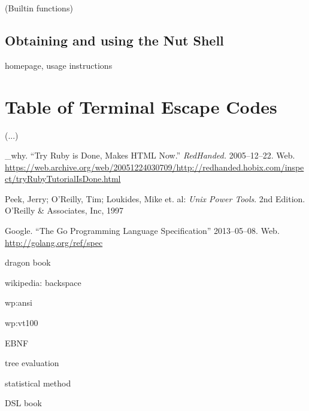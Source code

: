 \documentclass[paper=a4,twoside,abstract=on,cleardoublepage=empty,numbers=noenddot,toc=bib,12pt,appendixprefix=true]{scrreprt}
\begin{document}
(Builtin functions)

\section{Obtaining and using the Nut Shell}

homepage, usage instructions

\chapter{Table of Terminal Escape Codes}
\label{sec:esc}

(...)

\begin{thebibliography}{99}
        \_why. “Try Ruby is Done, Makes HTML Now.” \emph{RedHanded.} 2005--12--22. Web. \url{https://web.archive.org/web/20051224030709/http://redhanded.hobix.com/inspect/tryRubyTutorialIsDone.html}

        Peek, Jerry; O'Reilly, Tim; Loukides, Mike et. al: \emph{Unix Power Tools}. 2nd Edition. O'Reilly \& Associates, Inc, 1997

        Google. “The Go Programming Language Specification”  2013--05--08. Web. \url{http://golang.org/ref/spec}

    \bibitem{}
        dragon book

    \bibitem{}
        wikipedia: backspace

    \bibitem{}
        wp:ansi

    \bibitem{}
        wp:vt100

    \bibitem{}
        EBNF

    \bibitem{}
        tree evaluation

    \bibitem{}
        statistical method

    \bibitem{}
        DSL book
\end{thebibliography}
\end{document}
